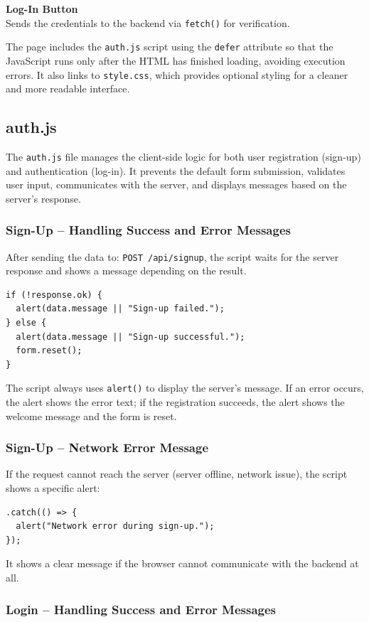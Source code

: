 \documentclass[11pt,a4paper]{report}
\begin{document}
\textbf{Log-In Button}\\
Sends the credentials to the backend via \texttt{fetch()} for verification.

The page includes the \texttt{auth.js} script using the \texttt{defer} attribute so that the JavaScript runs only after the HTML has finished loading, avoiding execution errors. It also links to \texttt{style.css}, which provides optional styling for a cleaner and more readable interface.


\subsection{auth.js}
The \texttt{auth.js} file manages the client-side logic for both user registration (sign-up) and authentication (log-in). It prevents the default form submission, validates user input, communicates with the server, and displays messages based on the server’s response.

\subsubsection{Sign-Up – Handling Success and Error Messages}
After sending the data to: \texttt{POST /api/signup},
the script waits for the server response and shows a message depending on the result.
\begin{lstlisting}
if (!response.ok) {
  alert(data.message || "Sign-up failed.");
} else {
  alert(data.message || "Sign-up successful.");
  form.reset();
}
\end{lstlisting}

The script always uses \texttt{alert()} to display the server’s message. If an error occurs, the alert shows the error text; if the registration succeeds, the alert shows the welcome message and the form is reset.

\subsubsection{Sign-Up – Network Error Message}
If the request cannot reach the server (server offline, network issue), the script shows a specific alert:
\begin{lstlisting}
.catch(() => {
  alert("Network error during sign-up.");
});
\end{lstlisting}

It shows a clear message if the browser cannot communicate with the backend at all.

\subsubsection{ Login – Handling Success and Error Messages}
\end{document}
